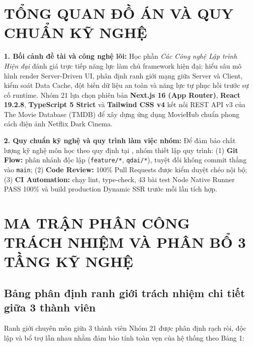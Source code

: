 \documentclass[12pt,a4paper]{extarticle}
\begin{document}
\section{TỔNG QUAN ĐỒ ÁN VÀ QUY CHUẨN KỸ NGHỆ}

\textbf{1. Bối cảnh đề tài và công nghệ lõi:} Học phần \textit{Các Công nghệ Lập trình Hiện đại} đánh giá trực tiếp năng lực làm chủ framework hiện đại: hiểu sâu mô hình render Server-Driven UI, phân định ranh giới mạng giữa Server và Client, kiểm soát Data Cache, đột biến dữ liệu an toàn và năng lực tự phục hồi trước sự cố runtime. Nhóm 21 lựa chọn phiên bản \textbf{Next.js 16 (App Router)}, \textbf{React 19.2.8}, \textbf{TypeScript 5 Strict} và \textbf{Tailwind CSS v4} kết nối REST API v3 của The Movie Database (TMDB) để xây dựng ứng dụng MovieHub chuẩn phong cách điện ảnh Netflix Dark Cinema.

\textbf{2. Quy chuẩn kỹ nghệ và quy trình làm việc nhóm:} Để đảm bảo chất lượng kỹ nghệ môn học theo quy định tại , nhóm thiết lập quy trình: (1) \textbf{Git Flow:} phân nhánh độc lập (\texttt{feature/*}, \texttt{qdai/*}), tuyệt đối không commit thẳng vào \texttt{main}; (2) \textbf{Code Review:} 100\% Pull Requests được kiểm duyệt chéo nội bộ; (3) \textbf{CI Automation:} chạy lint, type-check, 43 bài test Node Native Runner PASS 100\% và build production Dynamic SSR trước mỗi lần tích hợp.

\newpage
\section{MA TRẬN PHÂN CÔNG TRÁCH NHIỆM VÀ PHÂN BỔ 3 TẦNG KỸ NGHỆ}

\subsection{Bảng phân định ranh giới trách nhiệm chi tiết giữa 3 thành viên}

Ranh giới chuyên môn giữa 3 thành viên Nhóm 21 được phân định rạch ròi, độc lập và bổ trợ lẫn nhau nhằm đảm bảo tính toàn vẹn của hệ thống theo Bảng 1:
\end{document}
